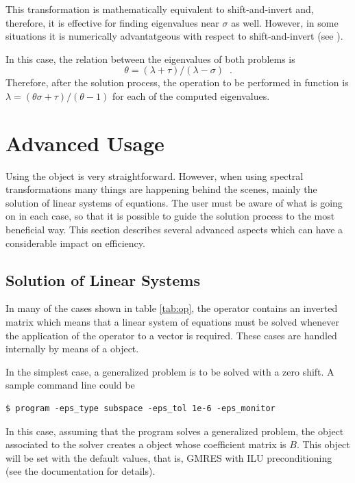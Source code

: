 This transformation is mathematically equivalent to shift-and-invert and, therefore, it is effective for finding eigenvalues near $\sigma$ as well. However, in some situations it is numerically advantatgeous with respect to shift-and-invert (see \citep[\S 11.2]{Bai:2000:TSA}).

In this case, the relation between the eigenvalues of both problems is
\begin{equation}\theta=(\lambda+\tau)/(\lambda-\sigma)\;\;.\end{equation}
Therefore, after the solution process, the operation to be performed in function  is $\lambda=(\theta\sigma+\tau)/(\theta-1)$ for each of the computed eigenvalues.


\section{Advanced Usage}

Using the  object is very straightforward. However, when using spectral transformations many things are happening behind the scenes, mainly the solution of linear systems of equations. The user must be aware of what is going on in each case, so that it is possible to guide the solution process to the most beneficial way. This section describes several advanced aspects which can have a considerable impact on efficiency.

\subsection{Solution of Linear Systems}
\label{sec:lin}

	In many of the cases shown in table \ref{tab:op}, the operator contains an inverted matrix which means that a linear system of equations must be solved whenever the application of the operator to a vector is required. These cases are handled internally by means of a  object.

	In the simplest case, a generalized problem is to be solved with a zero shift. A sample command line could be
\begin{Verbatim}[fontsize=\small]
	$ program -eps_type subspace -eps_tol 1e-6 -eps_monitor
\end{Verbatim}
In this case, assuming that the program solves a generalized problem, the  object associated to the  solver creates a  object whose coefficient matrix is $B$. This  object will be set with the default values, that is, GMRES with ILU preconditioning (see the \petsc{} documentation for details).

